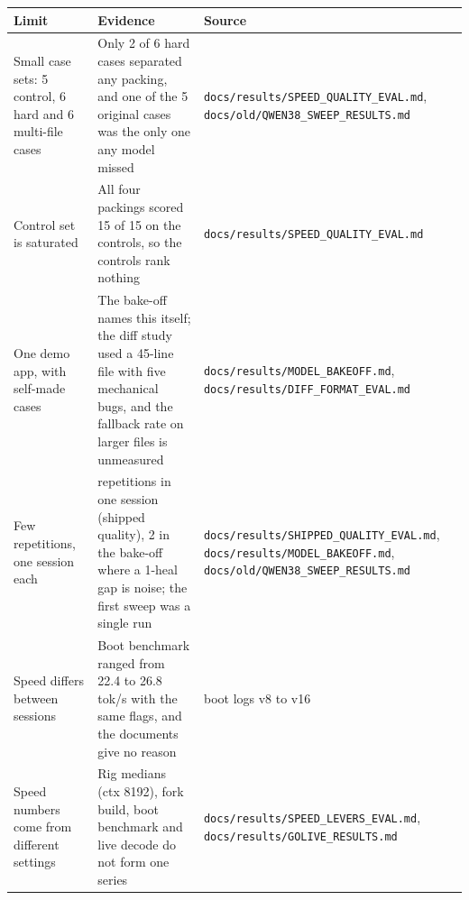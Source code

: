 \documentclass[11pt,a4paper]{report}
\begin{document}
\begin{longtable}{>{\raggedright\arraybackslash}p{0.322\dimexpr\linewidth-6\tabcolsep\relax}>{\raggedright\arraybackslash}p{0.339\dimexpr\linewidth-6\tabcolsep\relax}>{\raggedright\arraybackslash}p{0.339\dimexpr\linewidth-6\tabcolsep\relax}}
\toprule
\textbf{Limit} & \textbf{Evidence} & \textbf{Source} \\
\midrule
\endhead
Small case sets: 5 control, 6 hard and 6 multi-file cases & Only 2 of 6 hard cases separated any packing, and one of the 5 original cases was the only one any model missed & \texttt{docs/\allowbreak{}results/\allowbreak{}SPEED\_\allowbreak{}QUALITY\_\allowbreak{}EVAL.\allowbreak{}md}, \texttt{docs/\allowbreak{}old/\allowbreak{}QWEN38\_\allowbreak{}SWEEP\_\allowbreak{}RESULTS.\allowbreak{}md} \\
Control set is saturated & All four packings scored 15 of 15 on the controls, so the controls rank nothing & \texttt{docs/\allowbreak{}results/\allowbreak{}SPEED\_\allowbreak{}QUALITY\_\allowbreak{}EVAL.\allowbreak{}md} \\
One demo app, with self-made cases & The bake-off names this itself; the diff study used a 45-line file with five mechanical bugs, and the fallback rate on larger files is unmeasured & \texttt{docs/\allowbreak{}results/\allowbreak{}MODEL\_\allowbreak{}BAKEOFF.\allowbreak{}md}, \texttt{docs/\allowbreak{}results/\allowbreak{}DIFF\_\allowbreak{}FORMAT\_\allowbreak{}EVAL.\allowbreak{}md} \\
Few repetitions, one session each & 3 repetitions in one session (shipped quality), 2 in the bake-off where a 1-heal gap is noise; the first sweep was a single run & \texttt{docs/\allowbreak{}results/\allowbreak{}SHIPPED\_\allowbreak{}QUALITY\_\allowbreak{}EVAL.\allowbreak{}md}, \texttt{docs/\allowbreak{}results/\allowbreak{}MODEL\_\allowbreak{}BAKEOFF.\allowbreak{}md}, \texttt{docs/\allowbreak{}old/\allowbreak{}QWEN38\_\allowbreak{}SWEEP\_\allowbreak{}RESULTS.\allowbreak{}md} \\
Speed differs between sessions & Boot benchmark ranged from 22.4 to 26.8 tok/s with the same flags, and the documents give no reason & boot logs v8 to v16 \\
Speed numbers come from different settings & Rig medians (ctx 8192), fork build, boot benchmark and live decode do not form one series & \texttt{docs/\allowbreak{}results/\allowbreak{}SPEED\_\allowbreak{}LEVERS\_\allowbreak{}EVAL.\allowbreak{}md}, \texttt{docs/\allowbreak{}results/\allowbreak{}GOLIVE\_\allowbreak{}RESULTS.\allowbreak{}md} \\

\end{longtable}
\end{document}
